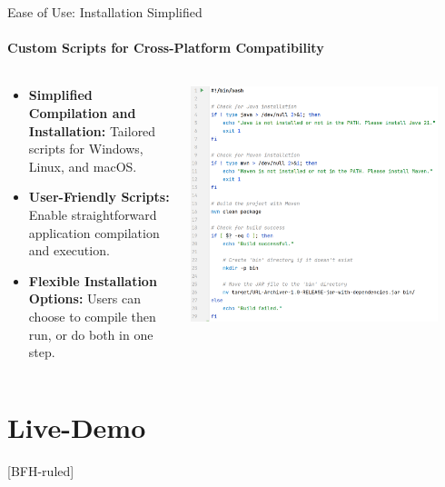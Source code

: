 \documentclass[
    ngerman,%
    authorontitle=true,
]{bfhbeamer}
\begin{document}
	\begin{frame}{Ease of Use: Installation Simplified}
		\framesubtitle{Custom Scripts for Cross-Platform Compatibility}
		\begin{columns} %
			\begin{column}{0.6\textwidth} %
				\begin{itemize}
					\item \textbf{Simplified Compilation and Installation:} Tailored scripts for Windows, Linux, and macOS.
					\item \textbf{User-Friendly Scripts:} Enable straightforward application compilation and execution.
					\item \textbf{Flexible Installation Options:} Users can choose to compile then run, or do both in one step.
				\end{itemize}
			\end{column}
			\begin{column}{0.4\textwidth} %
				\begin{center}
					\includegraphics[width=0.9\textwidth]{pictures/final_presentation/build_script.png}
				\end{center}
			\end{column}
		\end{columns} %
	\end{frame}

	\section{Live-Demo}
	[BFH-ruled]
	\frame{\sectionpage}
\end{document}
